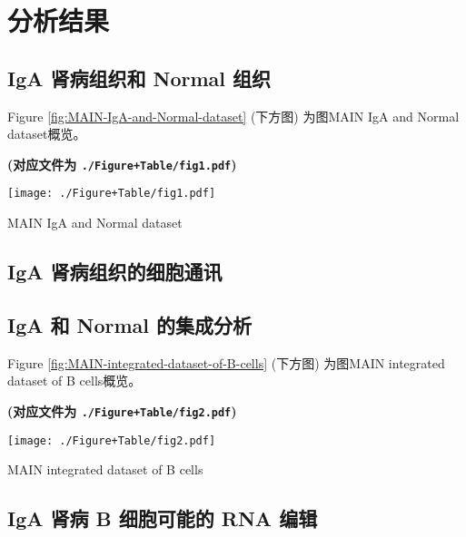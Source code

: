 \documentclass[
]{article}
\begin{document}
\hypertarget{results}{%
\section{分析结果}\label{results}}

\hypertarget{iga-ux80beux75c5ux7ec4ux7ec7ux548c-normal-ux7ec4ux7ec7}{%
\subsection{IgA 肾病组织和 Normal 组织}\label{iga-ux80beux75c5ux7ec4ux7ec7ux548c-normal-ux7ec4ux7ec7}}

Figure \ref{fig:MAIN-IgA-and-Normal-dataset} (下方图) 为图MAIN IgA and Normal dataset概览。

\textbf{(对应文件为 \texttt{./Figure+Table/fig1.pdf})}

\def\@captype{figure}
\begin{center}
\texttt{[image: ./Figure+Table/fig1.pdf]}
\caption{MAIN IgA and Normal dataset}\label{fig:MAIN-IgA-and-Normal-dataset}
\end{center}

\hypertarget{iga-ux80beux75c5ux7ec4ux7ec7ux7684ux7ec6ux80deux901aux8baf}{%
\subsection{IgA 肾病组织的细胞通讯}\label{iga-ux80beux75c5ux7ec4ux7ec7ux7684ux7ec6ux80deux901aux8baf}}

\hypertarget{iga-ux548c-normal-ux7684ux96c6ux6210ux5206ux6790}{%
\subsection{IgA 和 Normal 的集成分析}\label{iga-ux548c-normal-ux7684ux96c6ux6210ux5206ux6790}}

Figure \ref{fig:MAIN-integrated-dataset-of-B-cells} (下方图) 为图MAIN integrated dataset of B cells概览。

\textbf{(对应文件为 \texttt{./Figure+Table/fig2.pdf})}

\def\@captype{figure}
\begin{center}
\texttt{[image: ./Figure+Table/fig2.pdf]}
\caption{MAIN integrated dataset of B cells}\label{fig:MAIN-integrated-dataset-of-B-cells}
\end{center}

\hypertarget{iga-ux80beux75c5-b-ux7ec6ux80deux53efux80fdux7684-rna-ux7f16ux8f91}{%
\subsection{IgA 肾病 B 细胞可能的 RNA 编辑}\label{iga-ux80beux75c5-b-ux7ec6ux80deux53efux80fdux7684-rna-ux7f16ux8f91}}
\end{document}
